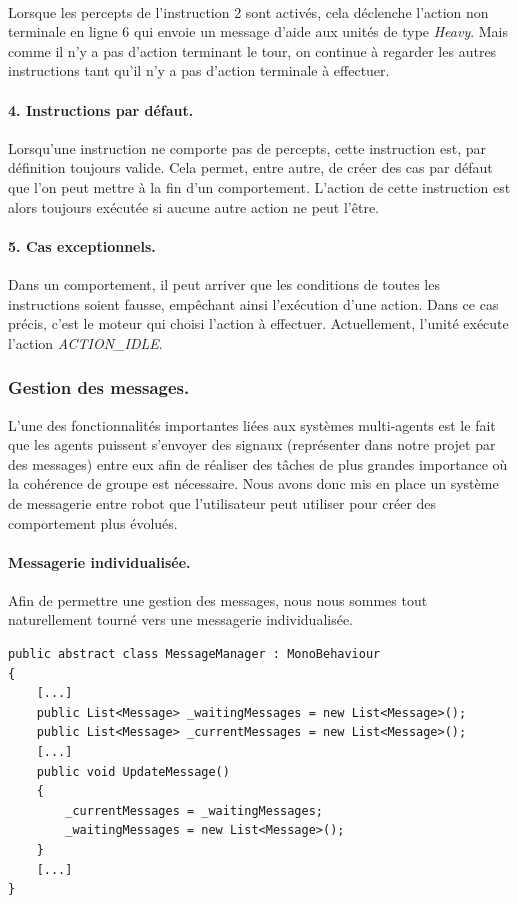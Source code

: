 \documentclass{report}
\begin{document}
\paragraph{}Lorsque les percepts de l'instruction 2 sont activés, cela déclenche l'action non terminale en ligne 6 qui envoie un message d'aide aux unités de type \textit{Heavy}. Mais comme il n'y a pas d'action terminant le tour, on continue à regarder les autres instructions tant qu'il n'y a pas d'action terminale à effectuer.

\paragraph{4. Instructions par défaut.}
Lorsqu'une instruction ne comporte pas de percepts, cette instruction est, par définition toujours valide. Cela permet, entre autre, de créer des cas par défaut que l'on peut mettre à la fin d'un comportement. L'action de cette instruction est alors toujours exécutée si aucune autre action ne peut l'être.

\paragraph{5. Cas exceptionnels.}
Dans un comportement, il peut arriver que les conditions de toutes les instructions soient fausse, empêchant ainsi l'exécution d'une action. Dans ce cas précis, c'est le moteur qui choisi l'action à effectuer. Actuellement, l'unité exécute l'action \textit{ACTION\_IDLE}.

\subsubsection{Gestion des messages.}
L'une des fonctionnalités importantes liées aux systèmes multi-agents est le fait que les agents puissent s'envoyer des signaux (représenter dans notre projet par des messages) entre eux afin de réaliser des tâches de plus grandes importance où la cohérence de groupe est nécessaire. Nous avons donc mis en place un système de messagerie entre robot que l'utilisateur peut utiliser pour créer des comportement plus évolués.

\paragraph{Messagerie individualisée.} 
Afin de permettre une gestion des messages, nous nous sommes tout naturellement tourné vers une messagerie individualisée.
 \begin{lstlisting}[language={[Sharp]C},label={lst:MessageManagerScript}, caption= Code du script MessageManager.cs]
public abstract class MessageManager : MonoBehaviour
{
	[...]
    public List<Message> _waitingMessages = new List<Message>();
    public List<Message> _currentMessages = new List<Message>();
	[...]
    public void UpdateMessage()
    {
        _currentMessages = _waitingMessages;
        _waitingMessages = new List<Message>();
    }
	[...]
}
\end{lstlisting}
\end{document}

